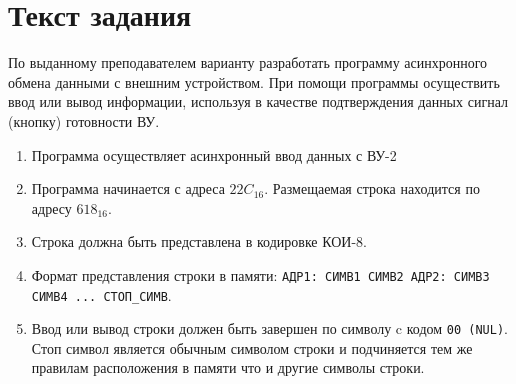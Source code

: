 \section{Текст задания}
По выданному преподавателем варианту разработать программу асинхронного обмена данными с внешним устройством. 
При помощи программы осуществить ввод или вывод информации, используя в качестве подтверждения данных сигнал (кнопку) готовности ВУ.
\begin{enumerate}
	\item Программа осуществляет асинхронный ввод данных с ВУ-2
	\item Программа начинается с адреса $22C_{16}$. Размещаемая строка находится по адресу $618_{16}$.
	\item Строка должна быть представлена в кодировке КОИ-8.
	\item Формат представления строки в памяти: \texttt{АДР1: СИМВ1 СИМВ2 АДР2: СИМВ3 СИМВ4 ... СТОП\_СИМВ}.
	\item Ввод или вывод строки должен быть завершен по символу c кодом \texttt{00 (NUL)}. Стоп символ является обычным символом строки и подчиняется тем же правилам расположения в памяти что и другие символы строки.
\end{enumerate}
